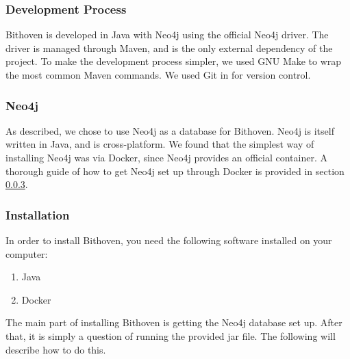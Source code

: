 \subsubsection{Development Process}
Bithoven is developed in Java with Neo4j using the official Neo4j driver. The
driver is managed through Maven, and is the only external dependency of the
project. To make the development process simpler, we used GNU Make to wrap the
most common Maven commands. We used Git in for version control.

\subsubsection{Neo4j}
As described, we chose to use Neo4j as a database for Bithoven. Neo4j is itself
written in Java, and is cross-platform. We found that the simplest way of
installing Neo4j was via Docker, since Neo4j provides an official container.
A thorough guide of how to get Neo4j set up through Docker is provided in
section \ref{inst-instr-inst}.

\subsubsection{Installation}
\label{inst-instr-inst}
In order to install Bithoven, you need the following software installed on your
computer:
\begin{enumerate}
    \item Java
    \item Docker
\end{enumerate}

The main part of installing Bithoven is getting the Neo4j database set up. After
that, it is simply a question of running the provided jar file. The following
will describe how to do this.


